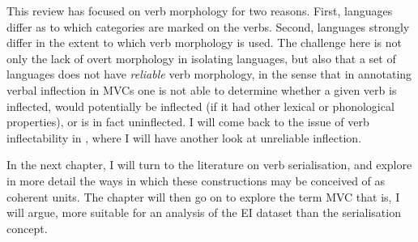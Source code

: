 This review has focused on verb morphology for two reasons. First, languages differ as to which categories are marked on the verbs. Second, languages strongly differ in the extent to which verb morphology is used. The challenge here is not only the lack of overt morphology in isolating languages, but also that a set of languages does not have \emph{reliable} verb morphology, in the sense that in annotating verbal inflection in MVCs one is not able to determine whether a given verb is inflected, would potentially be inflected (if it had other lexical or phonological properties), or is in fact uninflected. I will come back to the issue of verb inflectability in , where I will have another look at unreliable inflection.

In the next chapter, I will turn to the literature on verb serialisation, and explore in more detail the ways in which these constructions may be conceived of as coherent units. The chapter will then go on to explore the term MVC that is, I will argue, more suitable  for an analysis of the EI dataset than the serialisation concept.
